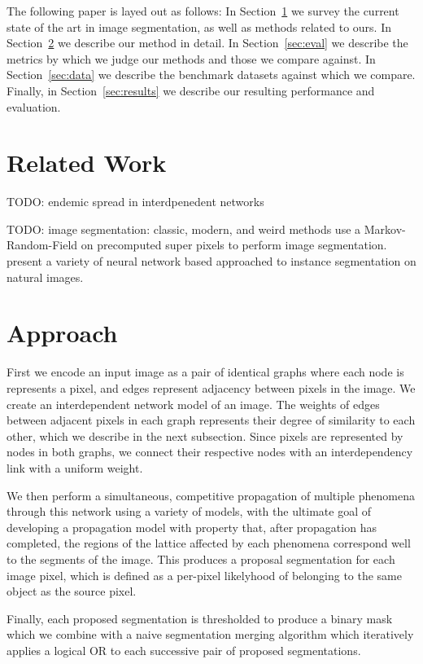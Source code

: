 \documentclass[twocolumn]{article}
\newcommand{\todo}[1]{}
\renewcommand{\todo}[1]{{\color{red} TODO: {#1}}}
\newcommand{\secref}[1]{Section~\ref{sec:#1}}
\newcommand{\seclab}[1]{\label{sec:#1}}
\begin{document}
The following paper is layed out as follows: In \secref{related} we survey the
current state of the art in image segmentation, as well as methods related to
ours. In \secref{approach} we describe our method in detail. In \secref{eval} we
describe the metrics by which we judge our methods and those we compare against.
In \secref{data} we describe the benchmark datasets against which we compare.
Finally, in \secref{results} we describe our resulting performance and
evaluation.

\section{Related Work}\seclab{related}

\todo{endemic spread in interdpenedent networks}

\todo{image segmentation: classic, modern, and weird methods}
\cite{pei2014saliency} use a Markov-Random-Field on precomputed super pixels to
perform image segmentation.  \cite{newell2017associative,li2017fully,ren2017end}
present a variety of neural network based approached to instance segmentation on
natural images.

\section{Approach}\seclab{approach}

First we encode an input image as a pair of identical graphs where each node is
represents a pixel, and edges represent adjacency between pixels in the image.
We create an interdependent network model of an image. The weights of
edges between adjacent pixels in each graph represents their degree of
similarity to each other, which we describe in the next subsection. Since pixels
are represented by nodes in both graphs, we connect their respective nodes with
an interdependency link with a uniform weight.

We then perform a simultaneous, competitive propagation of multiple
phenomena through this network using a variety of models, with the ultimate goal
of developing a propagation model with property that, after propagation has
completed, the regions of the lattice affected by each phenomena correspond well
to the segments of the image. This produces a proposal segmentation for each
image pixel, which is defined as a per-pixel likelyhood of belonging to the same
object as the source pixel.

Finally, each proposed segmentation is thresholded to produce a binary mask
which we combine with a naive segmentation merging algorithm which iteratively
applies a logical OR to each successive pair of proposed segmentations. 
\end{document}
